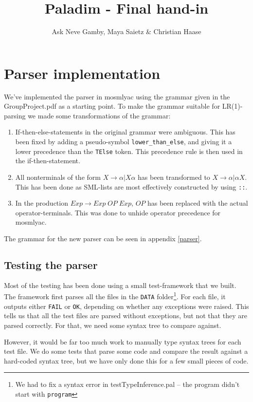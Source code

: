 \documentclass{article}
\title{Paladim - Final hand-in}
\author{Ask Neve Gamby, Maya Saietz \& Christian Haase}
\begin{document}
\maketitle
\tableofcontents
\newpage
\section{Parser implementation}
We've implemented the parser in mosmlyac using the grammar given in the GroupProject.pdf
as a starting point. To make the grammar suitable for LR(1)-parsing we made some
transformations of the grammar:
\begin{enumerate}
  \item If-then-else-statements in the original grammar were ambiguous. This has been
        fixed by adding a pseudo-symbol \texttt{lower\_than\_else}, and giving it a
        lower precedence than the \texttt{TElse} token. This precedence rule is then
        used in the if-then-statement.
  \item All nonterminals of the form $X \rightarrow \alpha | X \alpha$ has been transformed
        to $X \rightarrow \alpha | \alpha X$. This has been done as SML-lists are most
        effectively constructed by using \texttt{::}.
  \item In the production $Exp \rightarrow Exp \; OP \; Exp$, $OP$ has been replaced with
        the actual operator-terminals. This was done to unhide operator precedence for
        mosmlyac.
\end{enumerate}

The grammar for the new parser can be seen in appendix \ref{parser}.

\subsection{Testing the parser}
Most of the testing has been done using a small test-framework that we built. The framework
first parses all the files in the \texttt{DATA} folder\footnote{We had to fix a syntax error in testTypeInference.pal -- the program didn't start with \texttt{program}}. For each file, it outputs either
\texttt{FAIL} or \texttt{OK}, depending on whether any exceptions were raised. This tells us
that all the test files are parsed without exceptions, but not that they are parsed correctly.
For that, we need some syntax tree to compare against.

However, it would be far too much work to manually type syntax trees for each test file. We do
some tests that parse some code and compare the result against a hard-coded syntax tree, but
we have only done this for a few small pieces of code.
\end{document}
